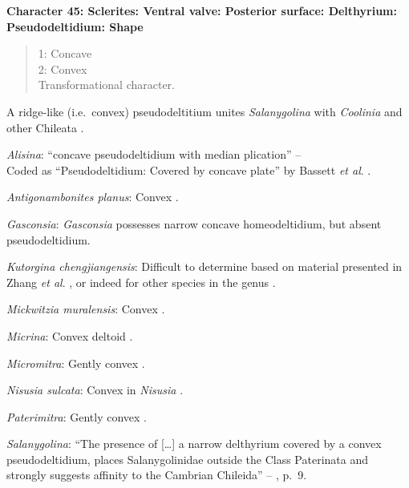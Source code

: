 \documentclass[openany]{book}
\theoremstyle{definition}
\theoremstyle{definition}
\theoremstyle{definition}
\theoremstyle{remark}
\begin{document}
\textbf{Character 45: Sclerites: Ventral valve: Posterior surface:
Delthyrium: Pseudodeltidium: Shape}

\begin{quote}
1: Concave\\
2: Convex\\
Transformational character.
\end{quote}

A ridge-like (i.e.~convex) pseudodeltitium unites \emph{Salanygolina}
with \emph{Coolinia} and other Chileata
\citep[p.~6]{Holmer2009Theenigmatic}.

\hypertarget{Alisina-coding-45}{}
\emph{Alisina}: ``concave pseudodeltidium with median plication'' --
\citet{Williams2000LinguliformeaCraniiformea}\\
Coded as ``Pseudodeltidium: Covered by concave plate'' by Bassett
\emph{et al}. \citeyearpar{Bassett2001Functionalmorphology}.

\hypertarget{Antigonambonites_planus-coding-45}{}
\emph{Antigonambonites planus}: Convex \citep[fig.
508]{Williams2000LinguliformeaCraniiformea}.

\hypertarget{Gasconsia-coding-45}{}
\emph{Gasconsia}: \emph{Gasconsia} possesses narrow concave
homeodeltidium, but absent pseudodeltidium.

\hypertarget{Kutorgina_chengjiangensis-coding-45}{}
\emph{Kutorgina chengjiangensis}: Difficult to determine based on
material presented in Zhang \emph{et al}.
\citeyearpar{Zhang2007Rhynchonelliformeanbrachiopods}, or indeed for
other species in the genus
\citep[e.g.][]{Williams2000LinguliformeaCraniiformea, Skovsted2005EarlyCambrian, Holmer2018Theattachment}.

\hypertarget{Mickwitzia_muralensis-coding-45}{}
\emph{Mickwitzia muralensis}: Convex \citep[see][fig.
4B]{Balthasar2004Shellstructure}.

\hypertarget{Micrina-coding-45}{}
\emph{Micrina}: Convex deltoid \citep{Holmer2008TheEarly}.

\hypertarget{Micromitra-coding-45}{}
\emph{Micromitra}: Gently convex \citep[see][fig.
83.3]{Williams2000LinguliformeaCraniiformea}.

\hypertarget{Nisusia_sulcata-coding-45}{}
\emph{Nisusia sulcata}: Convex in \emph{Nisusia} \citep[see][fig.
8.4]{Rowell1985Theevolutionary}.

\hypertarget{Paterimitra-coding-45}{}
\emph{Paterimitra}: Gently convex \citep[see][fig.
83.1]{Williams2000LinguliformeaCraniiformea}.

\hypertarget{Salanygolina-coding-45}{}
\emph{Salanygolina}: ``The presence of {[}\ldots{}{]} a narrow
delthyrium covered by a convex pseudodeltidium, places Salanygolinidae
outside the Class Paterinata and strongly suggests affinity to the
Cambrian Chileida'' -- \citet{Holmer2009Theenigmatic}, p.~9.
\end{document}

